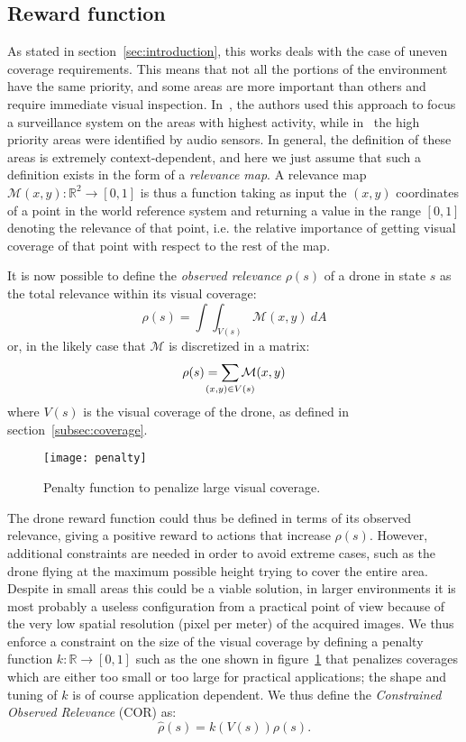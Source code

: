 \documentclass{article}
\begin{document}
\subsection{Reward function}
\label{subsec:reward}
As stated in section~\ref{sec:introduction}, this works deals with the case of uneven coverage requirements. This means that not all the portions of the environment have the same priority, and some areas are more important than others and require immediate visual inspection. In~\cite{piciarelli2011-automatic}, the authors used this approach to focus a surveillance system on the areas with highest activity, while in~\cite{piciarelli2012-network} the high priority areas were identified by audio sensors. In general, the definition of these areas is extremely context-dependent, and here we just assume that such a definition exists in the form of a \emph{relevance map}. A relevance map $\mathcal{M}(x,y): \mathbb{R}^2 \to [0,1]$ is thus a function taking as input the $(x,y)$ coordinates of a point in the world reference system and returning a value in the range $[0,1]$ denoting the relevance of that point, i.e. the relative importance of getting visual coverage of that point with respect to the rest of the map.

It is now possible to define the \emph{observed relevance} $\rho(s)$ of a drone in state $s$ as the total relevance within its visual coverage:
\begin{equation}
	\rho(s) = \int\!\int_{V(s)} \mathcal{M}(x,y)\ dA
\end{equation}
or, in the likely case that $\mathcal{M}$ is discretized in a matrix:
\begin{equation}
	\rho(s) = \sum_{\mathclap{(x,y)\in V(s)}} \mathcal{M}(x,y)
	\label{eq:rho}
\end{equation}
where $V(s)$ is the visual coverage of the drone, as defined in section~\ref{subsec:coverage}.

\begin{figure}
	\centering
	\texttt{[image: penalty]}
	\caption{Penalty function to penalize large visual coverage.}
	\label{fig:penalty}
\end{figure}
The drone reward function could thus be defined in terms of its observed relevance, giving a positive reward to actions that increase $\rho(s)$. However, additional constraints are needed in order to avoid extreme cases, such as the drone flying at the maximum possible height trying to cover the entire area. Despite in small areas this could be a viable solution, in larger environments it is most probably a useless configuration from a practical point of view because of the very low spatial resolution (pixel per meter) of the acquired images. We thus enforce a constraint on the size of the visual coverage by defining a penalty function $k:\mathbb{R}\to [0,1]$ such as the one shown in figure~\ref{fig:penalty} that penalizes coverages which are either too small or too large for practical applications; the shape and tuning of $k$ is of course application dependent. We thus define the \emph{Constrained Observed Relevance} (COR) as:
\begin{equation}
	\hat{\rho}(s) = k\left(V(s)\right) \rho(s).
	\label{eq:cor}
\end{equation}
\end{document}
